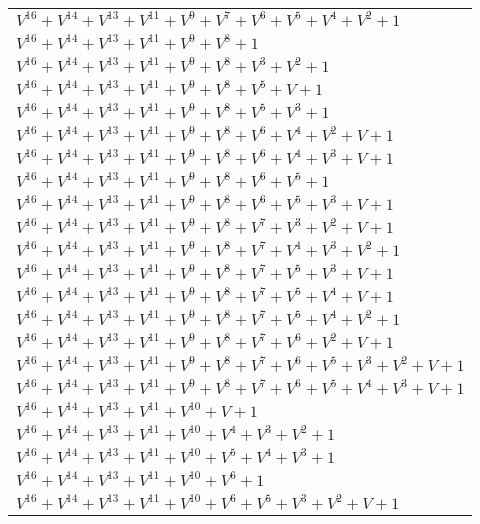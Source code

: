 \documentclass[12pt]{article}
\begin{document}
\begin{adjustwidth}{-4cm}{}
\begin{center}
\begin{longtable}{|l|}
$V^{16}  +V^{14}  +V^{13}  +V^{11}  +V^{9}  +V^{7}  +V^{6}  +V^{5}  +V^{4}  +V^{2}  + 1$ \\
$V^{16}  +V^{14}  +V^{13}  +V^{11}  +V^{9}  +V^{8}  + 1$ \\
$V^{16}  +V^{14}  +V^{13}  +V^{11}  +V^{9}  +V^{8}  +V^{3}  +V^{2}  + 1$ \\
$V^{16}  +V^{14}  +V^{13}  +V^{11}  +V^{9}  +V^{8}  +V^{5}  + V + 1$ \\
$V^{16}  +V^{14}  +V^{13}  +V^{11}  +V^{9}  +V^{8}  +V^{5}  +V^{3}  + 1$ \\
$V^{16}  +V^{14}  +V^{13}  +V^{11}  +V^{9}  +V^{8}  +V^{6}  +V^{4}  +V^{2}  + V + 1$ \\
$V^{16}  +V^{14}  +V^{13}  +V^{11}  +V^{9}  +V^{8}  +V^{6}  +V^{4}  +V^{3}  + V + 1$ \\
$V^{16}  +V^{14}  +V^{13}  +V^{11}  +V^{9}  +V^{8}  +V^{6}  +V^{5}  + 1$ \\
$V^{16}  +V^{14}  +V^{13}  +V^{11}  +V^{9}  +V^{8}  +V^{6}  +V^{5}  +V^{3}  + V + 1$ \\
$V^{16}  +V^{14}  +V^{13}  +V^{11}  +V^{9}  +V^{8}  +V^{7}  +V^{3}  +V^{2}  + V + 1$ \\
$V^{16}  +V^{14}  +V^{13}  +V^{11}  +V^{9}  +V^{8}  +V^{7}  +V^{4}  +V^{3}  +V^{2}  + 1$ \\
$V^{16}  +V^{14}  +V^{13}  +V^{11}  +V^{9}  +V^{8}  +V^{7}  +V^{5}  +V^{3}  + V + 1$ \\
$V^{16}  +V^{14}  +V^{13}  +V^{11}  +V^{9}  +V^{8}  +V^{7}  +V^{5}  +V^{4}  + V + 1$ \\
$V^{16}  +V^{14}  +V^{13}  +V^{11}  +V^{9}  +V^{8}  +V^{7}  +V^{5}  +V^{4}  +V^{2}  + 1$ \\
$V^{16}  +V^{14}  +V^{13}  +V^{11}  +V^{9}  +V^{8}  +V^{7}  +V^{6}  +V^{2}  + V + 1$ \\
$V^{16}  +V^{14}  +V^{13}  +V^{11}  +V^{9}  +V^{8}  +V^{7}  +V^{6}  +V^{5}  +V^{3}  +V^{2}  + V + 1$ \\
$V^{16}  +V^{14}  +V^{13}  +V^{11}  +V^{9}  +V^{8}  +V^{7}  +V^{6}  +V^{5}  +V^{4}  +V^{3}  + V + 1$ \\
$V^{16}  +V^{14}  +V^{13}  +V^{11}  +V^{10}  + V + 1$ \\
$V^{16}  +V^{14}  +V^{13}  +V^{11}  +V^{10}  +V^{4}  +V^{3}  +V^{2}  + 1$ \\
$V^{16}  +V^{14}  +V^{13}  +V^{11}  +V^{10}  +V^{5}  +V^{4}  +V^{3}  + 1$ \\
$V^{16}  +V^{14}  +V^{13}  +V^{11}  +V^{10}  +V^{6}  + 1$ \\
$V^{16}  +V^{14}  +V^{13}  +V^{11}  +V^{10}  +V^{6}  +V^{5}  +V^{3}  +V^{2}  + V + 1$ \\

\end{longtable}
\end{center}
\end{adjustwidth}
\end{document}
